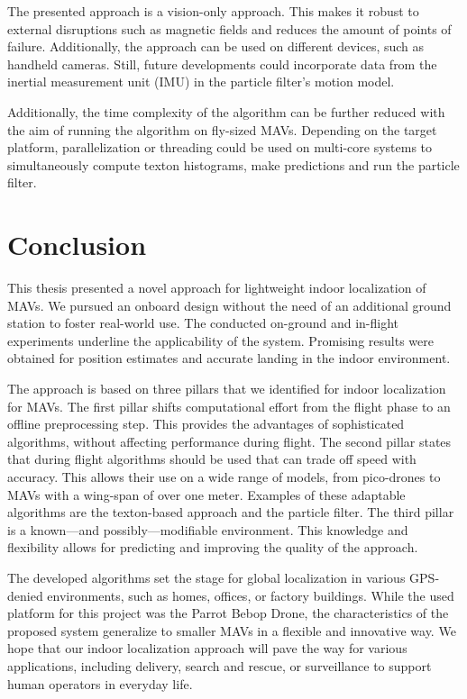 \documentclass{report}
\begin{document}
The presented approach is a vision-only approach. This makes it robust
to external disruptions such as magnetic fields and reduces the amount
of points of failure. Additionally, the approach can be used on
different devices, such as handheld cameras. Still, future
developments could incorporate data from the inertial measurement unit
(IMU) in the particle filter's motion model.

Additionally, the time complexity of the algorithm can be further
reduced with the aim of running the algorithm on fly-sized
MAVs. Depending on the target platform, parallelization or threading
could be used on multi-core systems to simultaneously compute texton
histograms, make predictions and run the particle filter.



\chapter{Conclusion}
\label{chap:conclusion}

This thesis presented a novel approach for lightweight indoor
localization of MAVs. We pursued an onboard design without the need of
an additional ground station to foster real-world use. The conducted
on-ground and in-flight experiments underline the applicability of the
system. Promising results were obtained for position estimates and
accurate landing in the indoor environment.

The approach is based on three pillars that we identified for indoor
localization for MAVs. The first pillar shifts computational effort
from the flight phase to an offline preprocessing step. This provides
the advantages of sophisticated algorithms, without affecting
performance during flight. The second pillar states that during flight
algorithms should be used that can trade off speed with accuracy. This
allows their use on a wide range of models, from pico-drones to MAVs
with a wing-span of over one meter. Examples of these adaptable
algorithms are the texton-based approach and the particle filter. The
third pillar is a known---and possibly---modifiable environment. This
knowledge and flexibility allows for predicting and improving the
quality of the approach.

The developed algorithms set the stage for global localization in
various GPS-denied environments, such as homes, offices, or factory
buildings. While the used platform for this project was the Parrot
Bebop Drone, the characteristics of the proposed system generalize to
smaller MAVs in a flexible and innovative way. We hope that our indoor
localization approach will pave the way for various applications,
including delivery, search and rescue, or surveillance to support
human operators in everyday life.

\printbibliography
\end{document}
